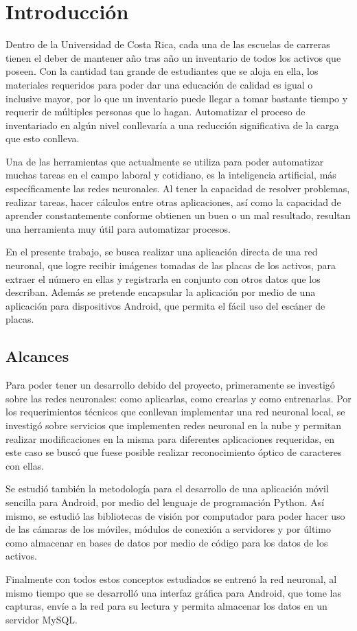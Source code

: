   \chapter{Introducción}
\label{C:introduccion}
Dentro de la Universidad de Costa Rica, cada una de las escuelas de carreras tienen el deber de mantener año tras año un inventario de todos los activos que poseen. Con la cantidad tan grande de estudiantes que se aloja en ella, los materiales requeridos para poder dar una educación de calidad es igual o inclusive mayor, por lo que un inventario puede llegar a tomar bastante tiempo y requerir de múltiples personas que lo hagan. Automatizar el proceso de inventariado en algún nivel conllevaría a una reducción significativa de la carga que esto conlleva.
\par
Una de las herramientas que actualmente se utiliza para poder automatizar muchas tareas en el campo laboral y cotidiano, es la inteligencia artificial, más específicamente las redes neuronales. Al tener la capacidad de resolver problemas, realizar tareas, hacer cálculos entre otras aplicaciones, así como la capacidad de aprender constantemente conforme obtienen un buen o un mal resultado, resultan una herramienta muy útil para automatizar procesos.
\par
En el presente trabajo, se busca realizar una aplicación directa de una red neuronal, que logre recibir imágenes tomadas de las placas de los activos, para extraer el número en ellas y registrarla en conjunto con otros datos que los describan. Además se pretende encapsular la aplicación por medio de una aplicación para dispositivos Android, que permita el fácil uso del escáner de placas.

\section{Alcances}
Para poder tener un desarrollo debido del proyecto, primeramente se investigó sobre las redes neuronales: como aplicarlas, como crearlas y como entrenarlas. Por los requerimientos técnicos que conllevan implementar una red neuronal local, se investigó sobre servicios que implementen redes neuronal en la nube y permitan realizar modificaciones en la misma para diferentes aplicaciones requeridas, en este caso se buscó que fuese posible realizar reconocimiento óptico de caracteres con ellas. 
\par
Se estudió también la metodología para el desarrollo de una aplicación móvil sencilla para Android, por medio del lenguaje de programación Python. Así mismo, se estudió las bibliotecas de visión por computador para poder hacer uso de las cámaras de los móviles, módulos de conexión a servidores y por último como almacenar en bases de datos por medio de código para los datos de los activos.
\par
Finalmente con todos estos conceptos estudiados se entrenó la red neuronal, al mismo tiempo que se desarrolló una interfaz gráfica para Android, que tome las capturas, envíe a la red para su lectura y permita almacenar los datos en un servidor MySQL.

